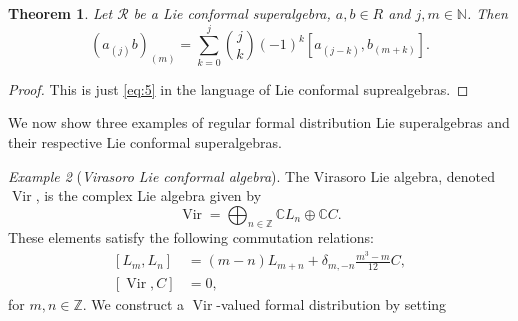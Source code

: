 \documentclass[a4paper, 12pt, reqno]{amsart}
\newtheorem{theorem}{Theorem}[section]
\theoremstyle{remark}
\newtheorem{example}[theorem]{Example}
\numberwithin{equation}{subsection}
\DeclareMathOperator{\Vir}{Vir}
\begin{document}
\begin{theorem}
  \label{thr:11}
  Let $\mathcal{R}$ be a Lie conformal superalgebra, $a, b \in R$ and $j, m \in \mathbb{N}$.
  Then
  \begin{equation*}
    (a_{(j)}b)_{(m)} = \sum_{k = 0}^j\binom{j}{k}(-1)^k[a_{(j - k)},b_{(m + k)}].
  \end{equation*}
\end{theorem}

\begin{proof}
  This is just \eqref{eq:5} in the language of Lie conformal suprealgebras.
\end{proof}

We now show three examples of regular formal distribution Lie superalgebras and their respective Lie conformal superalgebras.

\begin{example}[\emph{Virasoro Lie conformal algebra}]
  \label{exa:1}
  The Virasoro Lie algebra, denoted $\Vir$, is the complex Lie algebra given by
  \begin{equation*}
    \Vir = \bigoplus_{n \in \mathbb{Z}}\mathbb{C}L_{n} \oplus \mathbb{C}C.
  \end{equation*}
  These elements satisfy the following commutation relations:
  \begin{equation}
    \label{eq:8}
    \begin{aligned}
      [L_m, L_n] &= (m - n)L_{m + n} + \delta_{m, -n}\frac{m^3 - m}{12}C, \\
      [\Vir, C] &= 0,
    \end{aligned}
  \end{equation}
  for $m, n \in \mathbb{Z}$.
  We construct a $\Vir$-valued formal distribution by setting
  

\end{example}
\end{document}
